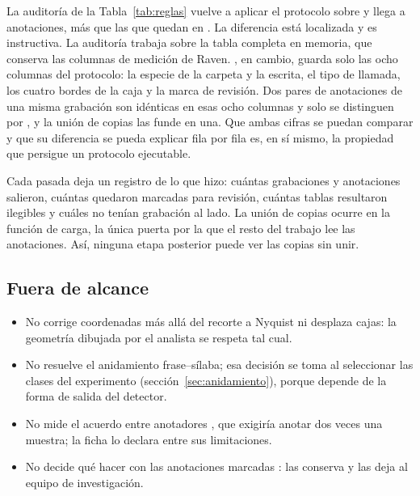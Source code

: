 La auditoría de la Tabla~\ref{tab:reglas} vuelve a aplicar el protocolo sobre
 y llega a \nKept{} anotaciones, \nCleanedDelta{} más que las
\nAnnotationsCleaned{} que quedan en . La diferencia está
localizada y es instructiva. La auditoría trabaja sobre la tabla completa en
memoria, que conserva las columnas de medición de Raven. , en
cambio, guarda solo las ocho columnas del protocolo: la especie de la carpeta y la
escrita, el tipo de llamada, los cuatro bordes de la caja y la marca de revisión.
Dos pares de anotaciones de una misma grabación son idénticas en esas ocho
columnas y solo se distinguen por , y la unión de copias las
funde en una. Que ambas cifras se puedan comparar y que su diferencia se pueda
explicar fila por fila es, en sí mismo, la propiedad que persigue un protocolo
ejecutable.

Cada pasada deja un registro de lo que hizo: cuántas grabaciones y anotaciones
salieron, cuántas quedaron marcadas para revisión, cuántas tablas resultaron
ilegibles y cuáles no tenían grabación al lado. La unión de copias ocurre en
la función de carga, la única puerta por la que el resto del trabajo lee las
anotaciones. Así, ninguna etapa posterior puede ver las copias sin unir.

\subsection{Fuera de alcance}

\begin{itemize}
    \item No corrige coordenadas más allá del recorte a Nyquist ni desplaza cajas:
          la geometría dibujada por el analista se respeta tal cual.
    \item No resuelve el anidamiento frase--sílaba; esa decisión se toma al
          seleccionar las clases del experimento (sección~\ref{sec:anidamiento}),
          porque depende de la forma de salida del detector.
    \item No mide el acuerdo entre anotadores \citep{leroy_reliability_2018}, que
          exigiría anotar dos veces una muestra; la ficha lo declara entre sus limitaciones.
    \item No decide qué hacer con las anotaciones marcadas :
          las conserva y las deja al equipo de investigación.
\end{itemize}

